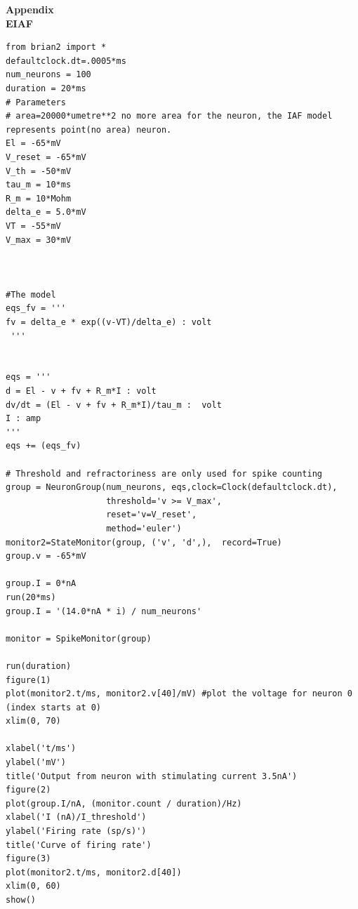 \documentclass[12pt]{article}
\begin{document}
\newpage
\large \textbf{Appendix}
\\

\normalsize\textbf{EIAF}
\\

\lstset{language=Python}
\begin{lstlisting}
from brian2 import *
defaultclock.dt=.0005*ms
num_neurons = 100
duration = 20*ms
# Parameters
# area=20000*umetre**2 no more area for the neuron, the IAF model represents point(no area) neuron.
El = -65*mV
V_reset = -65*mV
V_th = -50*mV
tau_m = 10*ms
R_m = 10*Mohm
delta_e = 5.0*mV
VT = -55*mV
V_max = 30*mV



#The model
eqs_fv = '''
fv = delta_e * exp((v-VT)/delta_e) : volt
 '''


eqs = '''
d = El - v + fv + R_m*I : volt
dv/dt = (El - v + fv + R_m*I)/tau_m :  volt
I : amp
'''
eqs += (eqs_fv)

# Threshold and refractoriness are only used for spike counting
group = NeuronGroup(num_neurons, eqs,clock=Clock(defaultclock.dt),
                    threshold='v >= V_max',
                    reset='v=V_reset',
                    method='euler')
monitor2=StateMonitor(group, ('v', 'd',),  record=True)
group.v = -65*mV

group.I = 0*nA
run(20*ms)
group.I = '(14.0*nA * i) / num_neurons'

monitor = SpikeMonitor(group)

run(duration)
figure(1)
plot(monitor2.t/ms, monitor2.v[40]/mV) #plot the voltage for neuron 0 (index starts at 0)
xlim(0, 70)

xlabel('t/ms')
ylabel('mV')
title('Output from neuron with stimulating current 3.5nA')
figure(2)
plot(group.I/nA, (monitor.count / duration)/Hz)
xlabel('I (nA)/I_threshold')
ylabel('Firing rate (sp/s)')
title('Curve of firing rate')
figure(3)
plot(monitor2.t/ms, monitor2.d[40])
xlim(0, 60)
show()
\end{lstlisting}
\newpage
\end{document}

